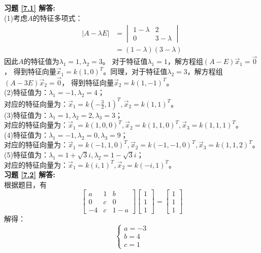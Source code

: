 \textbf{习题 \ref{7.1} 解答:}\\
(1)考虑$A$的特征多项式：
\begin{align*}
  |A-\lambda E|&=\begin{vmatrix}1-\lambda&2\\0&3-\lambda\end{vmatrix}\\
   & =(1-\lambda)(3-\lambda)
\end{align*}
因此$A$的特征值为$\lambda_1=1,\lambda_2=3$。 对于特征值$\lambda_1=1$，解方程组$(A-E)\vec{x}_1=\vec{0}$，
得到特征向量$\vec{x}_1=k(1,0)^T$。同理，对于特征值$\lambda_2=3$，解方程组$(A-3E)\vec{x}_2=\vec{0}$，
得到特征向量$\vec{x}_2=k(1,-1)^T$。\\
(2)特征值为：$\lambda_1=-1,\lambda_2=4$；\\
对应的特征向量为：$\vec{x}_1=k(-\frac{3}{2},1)^T,\vec{x}_2=k(1,1)^T$。\\
(3)特征值为：$\lambda_1=1,\lambda_2=2,\lambda_3=3$；\\
对应的特征向量为：$\vec{x}_1=k(1,0,0)^T,\vec{x}_2=k(1,1,0)^T,\vec{x}_3=k(1,1,1)^T$。\\
(4)特征值为：$\lambda_1=-1,\lambda_2=0,\lambda_3=9$；\\
对应的特征向量为：$\vec{x}_1=k(-1,1,0)^T,\vec{x}_2=k(-1,-1,0)^T,\vec{x}_3=k(1,1,2)^T$。\\
(5)特征值为：$\lambda_1=1+\sqrt{3}i,\lambda_2=1-\sqrt{3}i$；\\
对应的特征向量为：$\vec{x}_1=k(i,1)^T,\vec{x}_2=k(-i,1)^T$。\\
\textbf{习题 \ref{7.2} 解答:}\\
根据题目，有
\begin{equation*}
  \begin{bmatrix}a&1&b\\0&c&0\\-4&c&1-a\end{bmatrix}
  \begin{bmatrix}1\\1\\1\end{bmatrix}=
  \begin{bmatrix}1\\1\\1\end{bmatrix}
\end{equation*}
解得：
\begin{equation*}
  \begin{cases}
  a = -3\\
  b = 4\\
  c = 1
  \end{cases}
\end{equation*}
